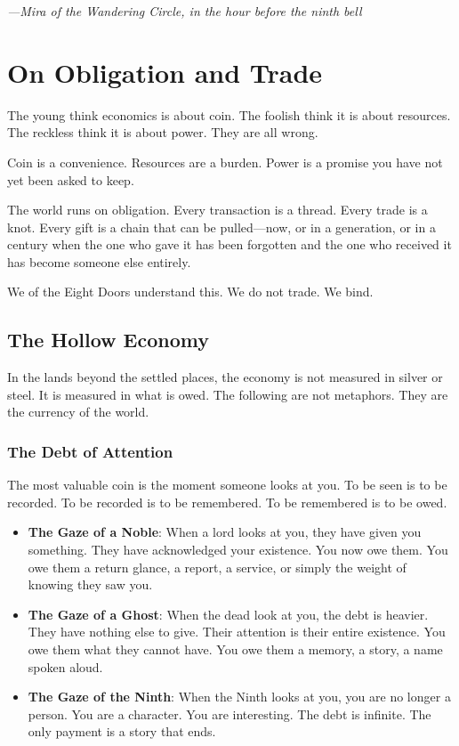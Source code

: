 \documentclass[12pt,oneside]{book}
\begin{document}
\textit{---Mira of the Wandering Circle, in the hour before the ninth bell}

\newpage
\chapter{On Obligation and Trade}

The young think economics is about coin. The foolish think it is about resources. The reckless think it is about power. They are all wrong.

Coin is a convenience. Resources are a burden. Power is a promise you have not yet been asked to keep.

The world runs on obligation. Every transaction is a thread. Every trade is a knot. Every gift is a chain that can be pulled---now, or in a generation, or in a century when the one who gave it has been forgotten and the one who received it has become someone else entirely.

We of the Eight Doors understand this. We do not trade. We bind.

\section{The Hollow Economy}

In the lands beyond the settled places, the economy is not measured in silver or steel. It is measured in what is owed. The following are not metaphors. They are the currency of the world.

\subsection{The Debt of Attention}

The most valuable coin is the moment someone looks at you. To be seen is to be recorded. To be recorded is to be remembered. To be remembered is to be owed.

\begin{itemize}
\item \textbf{The Gaze of a Noble}: When a lord looks at you, they have given you something. They have acknowledged your existence. You now owe them. You owe them a return glance, a report, a service, or simply the weight of knowing they saw you.
\item \textbf{The Gaze of a Ghost}: When the dead look at you, the debt is heavier. They have nothing else to give. Their attention is their entire existence. You owe them what they cannot have. You owe them a memory, a story, a name spoken aloud.
\item \textbf{The Gaze of the Ninth}: When the Ninth looks at you, you are no longer a person. You are a character. You are interesting. The debt is infinite. The only payment is a story that ends.
\end{itemize}
\end{document}

